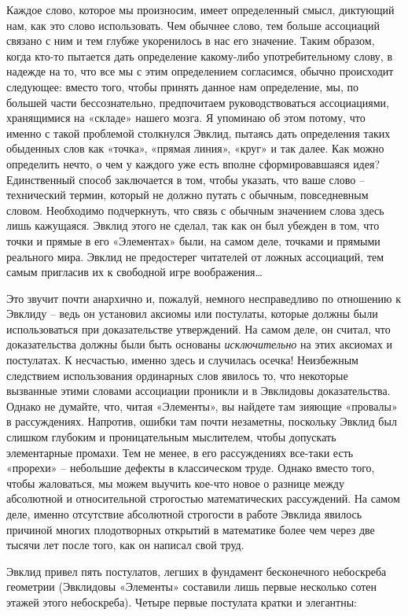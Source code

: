 \documentclass[../main.tex]{subfiles}
\begin{document}
Каждое слово, которое мы произносим, имеет определенный смысл, диктующий нам, как это слово использовать. Чем обычнее слово, тем больше ассоциаций связано с ним и тем глубже укоренилось в нас его значение. Таким образом, когда кто-то пытается дать определение какому-либо употребительному слову, в надежде на то, что все мы с этим определением согласимся, обычно происходит следующее: вместо того, чтобы принять данное нам определение, мы, по большей части бессознательно, предпочитаем руководствоваться ассоциациями, хранящимися на «складе» нашего мозга. Я упоминаю об этом потому, что именно с такой проблемой столкнулся Эвклид, пытаясь дать определения таких обыденных слов как «точка», «прямая линия», «круг» и так далее. Как можно определить нечто, о чем у каждого уже есть вполне сформировавшаяся идея? Единственный способ заключается в том, чтобы указать, что ваше слово \--- технический термин, который не должно путать с обычным, повседневным словом. Необходимо подчеркнуть, что связь с обычным значением слова здесь лишь кажущаяся. Эвклид этого не сделал, так как он был убежден в том, что точки и прямые в его «Элементах» были, на самом деле, точками и прямыми реального мира. Эвклид не предостерег читателей от ложных ассоциаций, тем самым пригласив их к свободной игре воображения\ldots{}

Это звучит почти анархично и, пожалуй, немного несправедливо по отношению к Эвклиду \--- ведь он установил аксиомы или постулаты, которые должны были использоваться при доказательстве утверждений. На самом деле, он считал, что доказательства должны были быть основаны \emph{исключительно} на этих аксиомах и постулатах. К несчастью, именно здесь и случилась осечка! Неизбежным следствием использования ординарных слов явилось то, что некоторые вызванные этими словами ассоциации проникли и в Эвклидовы доказательства. Однако не думайте, что, читая «Элементы», вы найдете там зияющие «провалы» в рассуждениях. Напротив, ошибки там почти незаметны, поскольку Эвклид был слишком глубоким и проницательным мыслителем, чтобы допускать элементарные промахи. Тем не менее, в его рассуждениях все-таки есть «прорехи» \--- небольшие дефекты в классическом труде. Однако вместо того, чтобы жаловаться, мы можем выучить кое-что новое о разнице между абсолютной и относительной строгостью математических рассуждений. На самом деле, именно отсутствие абсолютной строгости в работе Эвклида явилось причиной многих плодотворных открытий в математике более чем через две тысячи лет после того, как он написал свой труд.

Эвклид привел пять постулатов, легших в фундамент бесконечного небоскреба геометрии (Эвклидовы «Элементы» составили лишь первые несколько сотен этажей этого небоскреба). Четыре первые постулата кратки и элегантны:
\end{document}
